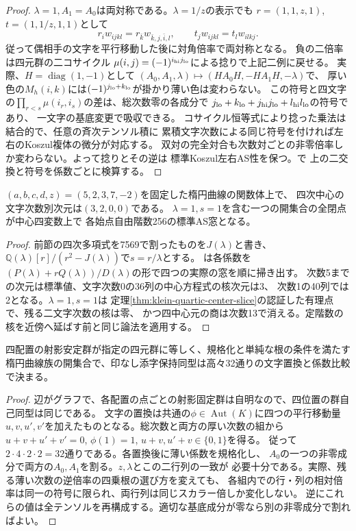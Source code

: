 \begin{proof}
$\lambda=1,A_1=A_0$は両対称である。$\lambda=1/z$の表示でも
$r=(1,1,z,1)$, $t=(1,1/z,1,1)$として
\[
 r_i w_{ijkl}=r_{\bar k}w_{\bar k,j,\bar i,l},\qquad
 t_j w_{ijkl}=t_l w_{ilkj}.
\]
従って偶相手の文字を平行移動した後に対角倍率で両対称となる。
負の二倍率は四元群の二コサイクル
$\mu(i,j)=(-1)^{i_{\rm hi} j_{\rm lo}}$による捻りで上記二例に戻せる。
実際、$H=\operatorname{diag}(1,-1)$として
$(A_0,A_1,\lambda)\mapsto(HA_0H,-HA_1H,-\lambda)$で、
厚い色の$M_h(i,k)$には$(-1)^{j_{\rm lo}+k_{\rm lo}}$が掛かり薄い色は変わらない。
この符号と四文字の$\prod_{r<s}\mu(i_r,i_s)$の差は、総次数零の各成分で
$j_{\rm lo}+k_{\rm lo}+j_{\rm hi}j_{\rm lo}+l_{\rm hi}l_{\rm lo}$の符号であり、
一文字の基底変更で吸収できる。
コサイクル恒等式により捻った乗法は結合的で、任意の斉次テンソル積に
累積文字次数による同じ符号を付ければ左右のKoszul複体の微分が対応する。
双対の完全対合も次数対ごとの非零倍率しか変わらない。よって捻りとその逆は
標準Koszul左右AS性を保つ。で
上の二交換と符号を係数ごとに検算する。
\end{proof}

\begin{proposition}\label{prop:klein-elliptic-center}
$(a,b,c,d,z)=(5,2,3,7,-2)$を固定した楕円曲線の関数体上で、
四次中心の文字次数別次元は$(3,2,0,0)$である。
$\lambda=1,s=1$を含む一つの開集合の全閉点が中心四変数上で
各始点自由階数256の標準AS窓となる。
\end{proposition}
\begin{proof}
前節の四次多項式を7569で割ったものを$J(\lambda)$と書き、
$\mathbb Q(\lambda)[r]/(r^2-J(\lambda))$で$s=r/\lambda$とする。
は各係数を
$(P(\lambda)+r Q(\lambda))/D(\lambda)$の形で四つの実際の窓を順に掃き出す。
次数5までの次元は標準値、文字次数0の36列の中心方程式の核次元は3、
次数1の40列では2となる。$\lambda=1,s=1$は
定理\ref{thm:klein-quartic-center-slice}の認証した有理点で、残る二文字次数の核は零、
かつ四中心元の商は次数13で消える。定階数の核を近傍へ延ばす前と同じ論法を適用する。
\end{proof}

\begin{corollary}[楕円曲線族の一般の印なし同型]\label{cor:klein-elliptic-isom}
四配置の射影安定群が指定の四元群に等しく、規格化と単純な根の条件を満たす
楕円曲線族の開集合で、印なし添字保持同型は高々32通りの文字置換と係数比較で決まる。
\end{corollary}
\begin{proof}
辺がグラフで、各配置の点ごとの射影固定群は自明なので、四位置の群自己同型は同じである。
文字の置換は共通の$\phi\in\operatorname{Aut}(K)$に四つの平行移動量
$u,v,u',v'$を加えたものとなる。総次数と両方の厚い次数の組から
$u+v+u'+v'=0$, $\phi(1)=1$, $u+v,u'+v\in\{0,1\}$を得る。
従って$2\cdot4\cdot2\cdot2=32$通りである。各置換後に薄い係数を規格化し、
$A_0$の一つの非零成分で両方の$A_0,A_1$を割る。$z,\lambda$とこの二行列の一致が
必要十分である。実際、残る薄い次数の逆倍率の四乗根の選び方を変えても、
各組内での行・列の相対倍率は同一の符号に限られ、両行列は同じスカラー倍しか変化しない。
逆にこれらの値は全テンソルを再構成する。適切な基底成分が零なら別の非零成分で割ればよい。
\end{proof}

